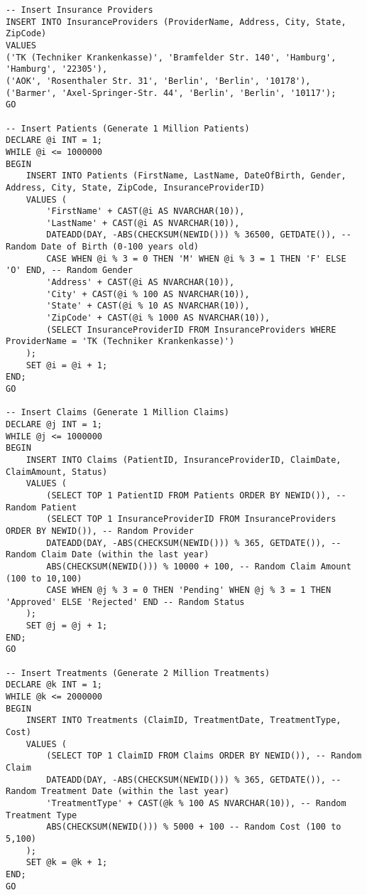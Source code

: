 \begin{lstlisting}[style=sqlstyle, caption={Script for Inserting Data}, label=lst:inserting_fullData]
-- Insert Insurance Providers
INSERT INTO InsuranceProviders (ProviderName, Address, City, State, ZipCode)
VALUES 
('TK (Techniker Krankenkasse)', 'Bramfelder Str. 140', 'Hamburg', 'Hamburg', '22305'),
('AOK', 'Rosenthaler Str. 31', 'Berlin', 'Berlin', '10178'),
('Barmer', 'Axel-Springer-Str. 44', 'Berlin', 'Berlin', '10117');
GO

-- Insert Patients (Generate 1 Million Patients)
DECLARE @i INT = 1;
WHILE @i <= 1000000
BEGIN
    INSERT INTO Patients (FirstName, LastName, DateOfBirth, Gender, Address, City, State, ZipCode, InsuranceProviderID)
    VALUES (
        'FirstName' + CAST(@i AS NVARCHAR(10)),
        'LastName' + CAST(@i AS NVARCHAR(10)),
        DATEADD(DAY, -ABS(CHECKSUM(NEWID())) % 36500, GETDATE()), -- Random Date of Birth (0-100 years old)
        CASE WHEN @i % 3 = 0 THEN 'M' WHEN @i % 3 = 1 THEN 'F' ELSE 'O' END, -- Random Gender
        'Address' + CAST(@i AS NVARCHAR(10)),
        'City' + CAST(@i % 100 AS NVARCHAR(10)),
        'State' + CAST(@i % 10 AS NVARCHAR(10)),
        'ZipCode' + CAST(@i % 1000 AS NVARCHAR(10)),
        (SELECT InsuranceProviderID FROM InsuranceProviders WHERE ProviderName = 'TK (Techniker Krankenkasse)')
    );
    SET @i = @i + 1;
END;
GO

-- Insert Claims (Generate 1 Million Claims)
DECLARE @j INT = 1;
WHILE @j <= 1000000
BEGIN
    INSERT INTO Claims (PatientID, InsuranceProviderID, ClaimDate, ClaimAmount, Status)
    VALUES (
        (SELECT TOP 1 PatientID FROM Patients ORDER BY NEWID()), -- Random Patient
        (SELECT TOP 1 InsuranceProviderID FROM InsuranceProviders ORDER BY NEWID()), -- Random Provider
        DATEADD(DAY, -ABS(CHECKSUM(NEWID())) % 365, GETDATE()), -- Random Claim Date (within the last year)
        ABS(CHECKSUM(NEWID())) % 10000 + 100, -- Random Claim Amount (100 to 10,100)
        CASE WHEN @j % 3 = 0 THEN 'Pending' WHEN @j % 3 = 1 THEN 'Approved' ELSE 'Rejected' END -- Random Status
    );
    SET @j = @j + 1;
END;
GO

-- Insert Treatments (Generate 2 Million Treatments)
DECLARE @k INT = 1;
WHILE @k <= 2000000
BEGIN
    INSERT INTO Treatments (ClaimID, TreatmentDate, TreatmentType, Cost)
    VALUES (
        (SELECT TOP 1 ClaimID FROM Claims ORDER BY NEWID()), -- Random Claim
        DATEADD(DAY, -ABS(CHECKSUM(NEWID())) % 365, GETDATE()), -- Random Treatment Date (within the last year)
        'TreatmentType' + CAST(@k % 100 AS NVARCHAR(10)), -- Random Treatment Type
        ABS(CHECKSUM(NEWID())) % 5000 + 100 -- Random Cost (100 to 5,100)
    );
    SET @k = @k + 1;
END;
GO
\end{lstlisting}